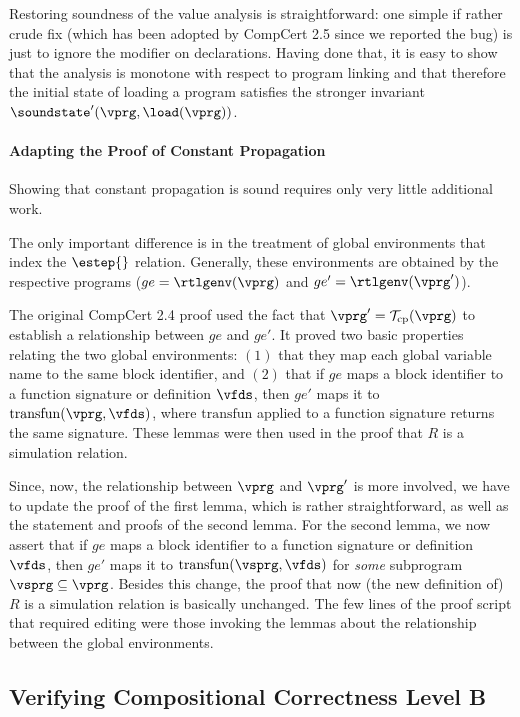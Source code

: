 Restoring soundness of the value analysis is straightforward: one
simple if rather crude fix (which has been adopted by CompCert 2.5
since we reported the bug) is just to ignore the  modifier
on  declarations.  Having done that, it is easy to show
that the analysis is monotone with respect to program linking and that
therefore the initial state of loading a program satisfies the
stronger invariant $\soundstate'(\vprg,\load(\vprg))$.


\paragraph{Adapting the Proof of Constant Propagation}

Showing that constant propagation is sound requires only very little additional work.

The only important difference is in the treatment of global environments that index the $\estep{}$ relation.
Generally, these environments are obtained by the respective programs ($ge=\rtlgenv(\vprg)$ and $ge'=\rtlgenv(\vprg')$). 

The original CompCert 2.4 proof used the fact that
$\vprg'=\mathcal{T}_{\rm cp}(\vprg)$ to establish a relationship
between $ge$ and $ge'$.  It proved two basic properties relating the
two global environments: $(1)$ that they map each global variable name
to the same block identifier, and $(2)$ that if $ge$ maps a block
identifier to a function signature or definition $\vfds$, then $ge'$
maps it to $\mathrm{transfun}(\vprg,\vfds)$, where $\mathrm{transfun}$
applied to a function signature returns the same signature.  These
lemmas were then used in the proof that $R$ is a simulation relation.

Since, now, the relationship between $\vprg$ and $\vprg'$ is more involved, 
we have to update the proof of the first lemma, which is rather straightforward,
as well as the statement and proofs of the second lemma.
For the second lemma, we now assert that 
if $ge$ maps a block identifier to a function signature or definition $\vfds$, 
then $ge'$ maps it to $\mathrm{transfun}(\vsprg,\vfds)$ for \emph{some} subprogram $\vsprg\subseteq\vprg$.
Besides this change, 
the proof that now (the new definition of) $R$ is a simulation relation is basically unchanged.
The few lines of the proof script that required editing were those invoking the lemmas about the relationship between the global environments.


\subsection{Verifying Compositional Correctness Level B}

